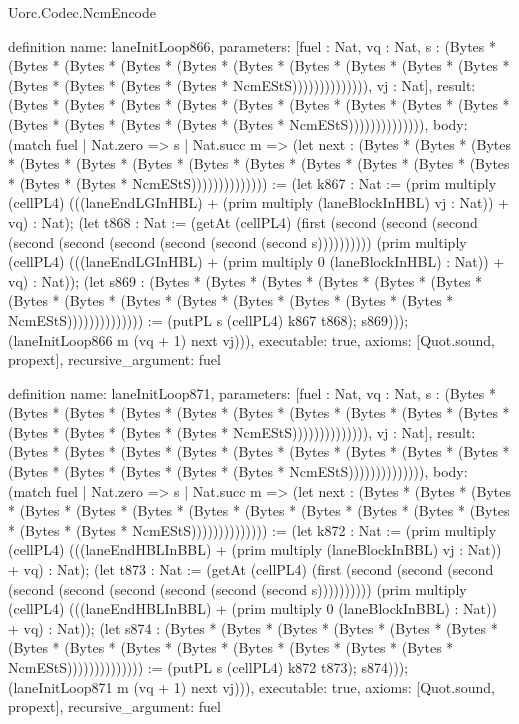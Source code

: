 \begin{lexlean}{Uorc.Codec.NcmEncode}
\begin{semanticmodule}
definition{
  name: laneInitLoop866,
  parameters: [fuel : Nat, vq : Nat, s : (Bytes * (Bytes * (Bytes * (Bytes * (Bytes * (Bytes * (Bytes * (Bytes * (Bytes * (Bytes * (Bytes * (Bytes * (Bytes * (Bytes * NcmEStS)))))))))))))), vj : Nat],
  result: (Bytes * (Bytes * (Bytes * (Bytes * (Bytes * (Bytes * (Bytes * (Bytes * (Bytes * (Bytes * (Bytes * (Bytes * (Bytes * (Bytes * NcmEStS)))))))))))))),
  body: (match fuel
    | Nat.zero => s
    | Nat.succ m => (let next : (Bytes * (Bytes * (Bytes * (Bytes * (Bytes * (Bytes * (Bytes * (Bytes * (Bytes * (Bytes * (Bytes * (Bytes * (Bytes * (Bytes * NcmEStS)))))))))))))) := (let k867 : Nat := (prim multiply (cellPL4) (((laneEndLGInHBL) + (prim multiply (laneBlockInHBL) vj : Nat)) + vq) : Nat); (let t868 : Nat := (getAt (cellPL4) (first (second (second (second (second (second (second (second (second (second s)))))))))) (prim multiply (cellPL4) (((laneEndLGInHBL) + (prim multiply 0 (laneBlockInHBL) : Nat)) + vq) : Nat)); (let s869 : (Bytes * (Bytes * (Bytes * (Bytes * (Bytes * (Bytes * (Bytes * (Bytes * (Bytes * (Bytes * (Bytes * (Bytes * (Bytes * (Bytes * NcmEStS)))))))))))))) := (putPL s (cellPL4) k867 t868); s869))); (laneInitLoop866 m (vq + 1) next vj))),
  executable: true,
  axioms: [Quot.sound, propext],
  recursive_argument: fuel
}

definition{
  name: laneInitLoop871,
  parameters: [fuel : Nat, vq : Nat, s : (Bytes * (Bytes * (Bytes * (Bytes * (Bytes * (Bytes * (Bytes * (Bytes * (Bytes * (Bytes * (Bytes * (Bytes * (Bytes * (Bytes * NcmEStS)))))))))))))), vj : Nat],
  result: (Bytes * (Bytes * (Bytes * (Bytes * (Bytes * (Bytes * (Bytes * (Bytes * (Bytes * (Bytes * (Bytes * (Bytes * (Bytes * (Bytes * NcmEStS)))))))))))))),
  body: (match fuel
    | Nat.zero => s
    | Nat.succ m => (let next : (Bytes * (Bytes * (Bytes * (Bytes * (Bytes * (Bytes * (Bytes * (Bytes * (Bytes * (Bytes * (Bytes * (Bytes * (Bytes * (Bytes * NcmEStS)))))))))))))) := (let k872 : Nat := (prim multiply (cellPL4) (((laneEndHBLInBBL) + (prim multiply (laneBlockInBBL) vj : Nat)) + vq) : Nat); (let t873 : Nat := (getAt (cellPL4) (first (second (second (second (second (second (second (second (second (second s)))))))))) (prim multiply (cellPL4) (((laneEndHBLInBBL) + (prim multiply 0 (laneBlockInBBL) : Nat)) + vq) : Nat)); (let s874 : (Bytes * (Bytes * (Bytes * (Bytes * (Bytes * (Bytes * (Bytes * (Bytes * (Bytes * (Bytes * (Bytes * (Bytes * (Bytes * (Bytes * NcmEStS)))))))))))))) := (putPL s (cellPL4) k872 t873); s874))); (laneInitLoop871 m (vq + 1) next vj))),
  executable: true,
  axioms: [Quot.sound, propext],
  recursive_argument: fuel
}


\end{semanticmodule}
\end{lexlean}
